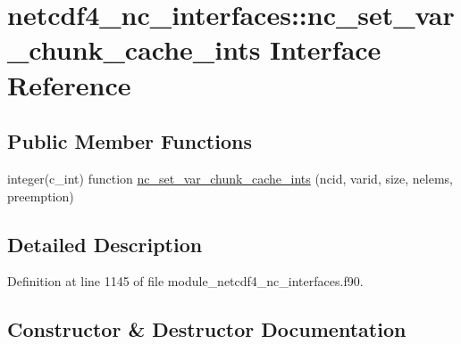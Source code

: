 \hypertarget{interfacenetcdf4__nc__interfaces_1_1nc__set__var__chunk__cache__ints}{}\section{netcdf4\+\_\+nc\+\_\+interfaces\+:\+:nc\+\_\+set\+\_\+var\+\_\+chunk\+\_\+cache\+\_\+ints Interface Reference}
\label{interfacenetcdf4__nc__interfaces_1_1nc__set__var__chunk__cache__ints}
\subsection*{Public Member Functions}
\begin{DoxyCompactItemize}
\item 
integer(c\+\_\+int) function \hyperlink{interfacenetcdf4__nc__interfaces_1_1nc__set__var__chunk__cache__ints_a343ae1cf13a8e5bef1fd46058f027610}{nc\+\_\+set\+\_\+var\+\_\+chunk\+\_\+cache\+\_\+ints} (ncid, varid, size, nelems, preemption)
\end{DoxyCompactItemize}


\subsection{Detailed Description}


Definition at line 1145 of file module\+\_\+netcdf4\+\_\+nc\+\_\+interfaces.\+f90.



\subsection{Constructor \& Destructor Documentation}
\mbox{\label{interfacenetcdf4__nc__interfaces_1_1nc__set__var__chunk__cache__ints_a343ae1cf13a8e5bef1fd46058f027610}} 
